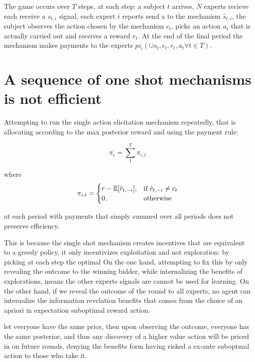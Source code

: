 The game occurs over $T$ steps, at each step: a subject $t$ arrives, $N$ experts recieve each receive a $s_{t,i}$ signal, each expert $i$ reports send a to the mechanism $\hat{s}_{t,i}$, the subject observes the action chosen by the mechanism $c_t$, picks an action $a_t$ that is actually carried out and receives a reward $r_t$.
At the end of the final period the mechanism makes payments to the experts $pi_i( \cup \hat{s}_t,c_t,r_t,a_t \forall t \in T)$.


\section{A sequence of one shot mechanisms is not efficient}

Attempting to run the single action elicitation mechanism repeatedly, that is allocating according to the max posterior reward and using the payment rule:

\[
    \pi_i = \sum_1^T \pi_{i,t} 
\]

where 
\[
    \pi_{i,t} =
\begin{cases}
    r - \expec[\hat{r}_{t,-i}] ,& \text{if } \hat{c}_{t,-i} \neq c_t\\
    0,              & \text{otherwise}
\end{cases}
\]

 at each period with payments that simply summed over all periods does not preserve efficiency.

This is because the single shot mechanism creates incentives that are equivalent to a greedy policy, it only incentivizes exploitation and not exploration: by picking at each step the optimal 
On the one hand, attempting to fix this by only revealing the outcome to the winning bidder, while internalizing the benefits of explorations, means the other experts signals are cannot be used for learning. 
On the other hand, if we reveal the outcome of the round to all experts,  no agent can internalize the information revelation benefits that comes from the choice of an apriori in expectation suboptimal reward action. 

\begin{eg}
let everyone have the same prior, then upon observing the outcome, everyone has the same posterior, and thus any discovery of a higher value action will be priced in on future rounds, denying the benefits form having risked a ex-ante suboptmal action to those who take it. 
\end{eg}

